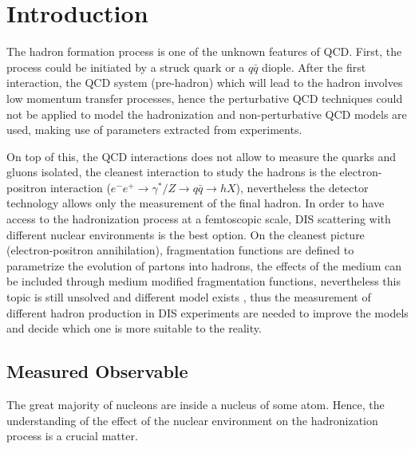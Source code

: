 \chapter{Introduction}
The hadron formation process is one of the unknown features of QCD. First, the process could be initiated by a struck quark or a $q\bar{q}$ diople. After the first interaction, the QCD system (pre-hadron) which will lead to the hadron involves low momentum transfer processes, hence the perturbative QCD techniques could not be applied to model the hadronization and non-perturbative QCD models are used, making use of parameters extracted from experiments.

On top of this, the QCD interactions does not allow to measure the quarks and gluons isolated, the cleanest interaction to study the hadrons is the electron-positron interaction ($e^-e^+ \rightarrow \gamma^*/Z \rightarrow q\bar{q} \rightarrow hX$), nevertheless the detector technology allows only the measurement of the final hadron. In order to have access to the hadronization process at a femtoscopic scale, DIS scattering with different nuclear environments is the best option. On the cleanest picture (electron-positron annihilation), fragmentation functions are defined to parametrize the evolution of partons into hadrons, the effects of the medium can be included through medium modified fragmentation functions, nevertheless this topic is still unsolved and different model exists \cite{FF_feynman, string_1,string_2,string_3_lund,precolor_1,precolor_2,precolor_3}, thus the measurement of different hadron production in DIS experiments are needed to improve the models and decide which one is more suitable to the reality.

\section{Measured Observable}
The great majority of nucleons are inside a nucleus of some atom. Hence, the understanding of the effect of the nuclear environment on the  hadronization process is a crucial matter.  

